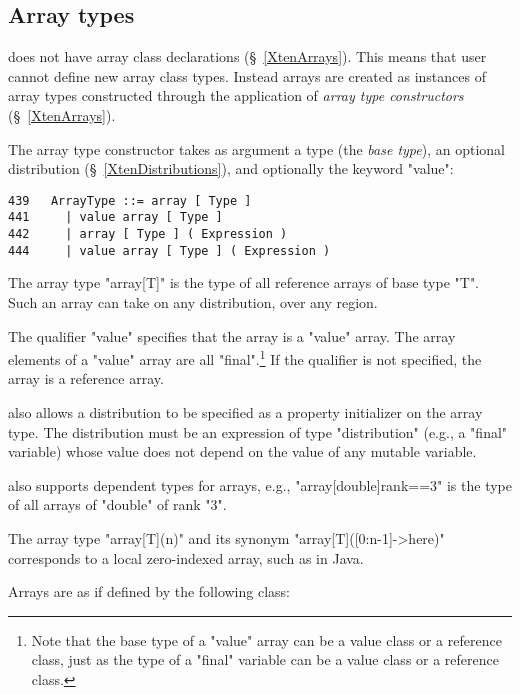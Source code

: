 \subsection{Array types}
\label{ArrayTypeConstructors}

{}\XtenCurrVer{} does not have array class declarations
(\S~\ref{XtenArrays}). This means that user cannot define new array
class types. Instead arrays are created as instances of array types
constructed through the application of {\em array type constructors}
(\S~\ref{XtenArrays}).

The array type constructor takes as argument a type (the {\em base
type}), an optional distribution (\S~\ref{XtenDistributions}), and
optionally the keyword \xcd"value":
\begin{verbatim}
439   ArrayType ::= array [ Type ]
441     | value array [ Type ]
442     | array [ Type ] ( Expression )
444     | value array [ Type ] ( Expression )
\end{verbatim}

The array type \xcd"array[T]" is the type of all
reference arrays of base type \xcd"T". Such an array can take on any
distribution, over any region. 

The qualifier \xcd"value" specifies that the array
is a \xcd"value" array. The array elements of a \xcd"value" array are
all \xcd"final".\footnote{Note that the base type of a \xcd"value" array can be a value class or a reference class, just as the 
type of a \xcd"final" variable can be a value class or a reference class.}
If the qualifier is not specified, the array is a reference array.

\XtenCurrVer{} also allows a distribution to be specified 
as a property initializer on the array type.
The distribution must be an expression of type
\xcd"distribution" (e.g., a \xcd"final" variable) whose
value does not depend on the value of any mutable variable.

\Xten{} also supports dependent types for arrays,
e.g.,
\xcd"array[double]{rank==3}" is the type of all arrays of 
\xcd"double" of rank \xcd"3".

The array type
\xcd"array[T](n)" and its synonym
\xcd"array[T]([0:n-1]->here)" corresponds to a local
zero-indexed array, such as in Java.


Arrays are as if defined by the following class:

\fi

